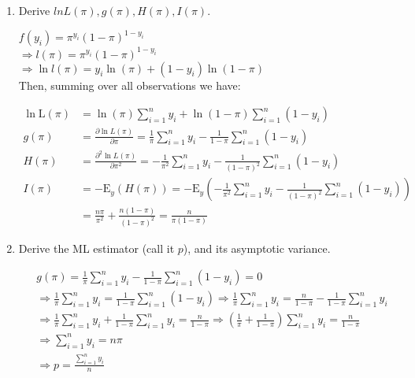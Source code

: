 \documentclass[11pt,reqno]{amsart}   %
\newcommand{\ksp}{\vspace{0.1in}}   %
\newcommand{\kl}{\left(}
\newcommand{\kr}{\right)}
\begin{document}
\begin{enumerate}
\item  Derive $lnL\kl \pi \kr, g\kl \pi \kr, H\kl \pi \kr, I\kl \pi \kr$.

$f\kl y_i \kr =\pi^{y_i}\kl 1-\pi \kr^{1-y_i}$\\
$\Rightarrow l\kl \pi \kr =\pi^{y_i}\kl 1-\pi \kr^{1-y_i}$\\
$\Rightarrow \ln l\kl \pi \kr = y_i \ln \kl \pi \kr + \kl 1-y_i\kr \ln\kl 1-\pi \kr$\\

Then, summing over all observations we have:
\ksp

\begin{equation*}
\begin{split}
\ln \mathrm{L}(\pi)&=\ln (\pi) \sum_{i=1}^{n} y_{i}+\ln (1-\pi) \sum_{i=1}^{n}\left(1-y_{i}\right)\\
g(\pi)&=\frac{\partial \ln L(\pi)}{\partial \pi}=\frac{1}{\pi} \sum_{i=1}^{n} y_{i}-\frac{1}{1-\pi} \sum_{i=1}^{n}\left(1-y_{i}\right)\\
H(\pi)&=\frac{\partial^{2} \ln L(\pi)}{\partial \pi^{2}}=-\frac{1}{\pi^{2}} \sum_{i=1}^{n} y_{i}-\frac{1}{(1-\pi)^{2}} \sum_{i=1}^{n}\left(1-y_{i}\right)\\
I(\pi)&=-\mathrm{E}_{y}(H(\pi))=-\mathrm{E}_{y}\left(-\frac{1}{\pi^{2}} \sum_{i=1}^{n} y_{i}-\frac{1}{(1-\pi)^{2}} \sum_{i=1}^{n}\left(1-y_{i}\right)\right)\\&=\frac{n \pi}{\pi^{2}}+\frac{n(1-\pi)}{(1-\pi)^{2}}=\frac{n}{\pi(1-\pi)}
\end{split}
\end{equation*}



\item	Derive the ML estimator (call it $p$), and its asymptotic variance.

\begin{equation*}
\begin{split}
& g(\pi)=\frac{1}{\pi} \sum_{i=1}^{n} y_{i}-\frac{1}{1-\pi} \sum_{i=1}^{n}\left(1-y_{i}\right)=0\\
& \Rightarrow \frac{1}{\pi} \sum_{i=1}^{n} y_{i}=\frac{1}{1-\pi} \sum_{i=1}^{n}\left(1-y_{i}\right) \Rightarrow \frac{1}{\pi} \sum_{i=1}^{n} y_{i}=\frac{n}{1-\pi}-\frac{1}{1-\pi} \sum_{i=1}^{n} y_{i} \\
& \Rightarrow \frac{1}{\pi} \sum_{i=1}^{n} y_{i}+\frac{1}{1-\pi} \sum_{i=1}^{n} y_{i}=\frac{n}{1-\pi} \Rightarrow \left(\frac{1}{\pi}+\frac{1}{1-\pi}\right) \sum_{i=1}^{n} y_{i}=\frac{n}{1-\pi}\\
&\Rightarrow \sum_{i=1}^{n} y_{i} = n\pi\\
&\Rightarrow p=\frac{\sum_{i=1}^{n} y_{i}}{n}
\end{split}
\end{equation*}


\end{enumerate}
\end{document}
